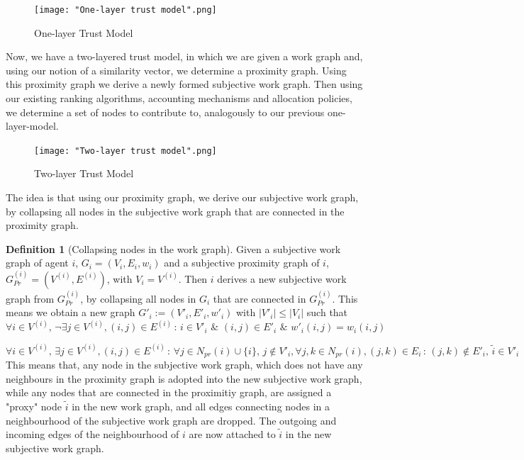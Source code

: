 \documentclass[11pt,a4paper]{article}
\theoremstyle{definition}
\newtheorem{definition}{Definition}[section]
\theoremstyle{theorem}
\theoremstyle{proposition}
\theoremstyle{corollary}
\theoremstyle{lemma}
\theoremstyle{example}
\theoremstyle{remark}
\begin{document}
\begin{figure}[H]
\begin{center}
\texttt{[image: "One-layer trust model".png]}
\caption{One-layer Trust Model}
\label{fig:One-layer trust model}
\end{center}
\end{figure}

\noindent{}Now, we have a two-layered trust model, in which we are given a work graph and, using our notion of a similarity vector, we determine a proximity graph. Using this proximity graph we derive a newly formed subjective work graph. Then using our existing ranking algorithms, accounting mechanisms and allocation policies, we determine a set of nodes to contribute to, analogously to our previous one-layer-model. \vspace{1em}\\

\begin{figure}[H]
\texttt{[image: "Two-layer trust model".png]}
\caption{Two-layer Trust Model}
\label{fig:Two-layer trust model}
\end{figure}
\noindent{}The idea is that using our proximity graph, we derive our subjective work graph, by collapsing all nodes in the subjective work graph that are connected in the proximity graph. \vspace{1em}\\
\newpage
\begin{definition}[Collapsing nodes in the work graph]
Given a subjective work graph of agent $i$, $G_i=(V_i,E_i,w_i)$ and a subjective proximity graph of $i$, $G^{(i)}_{Pr}=(V^{(i)}, E^{(i)})$, with $V_i=V^{(i)}$. Then $i$ derives a new subjective work graph from $G^{(i)}_{Pr}$, by collapsing all nodes in $G_i$ that are connected in $G^{(i)}_{Pr}$. This means we obtain a new graph $G'_i:=(V'_i, E'_i, w'_i)$ with $|V'_i|\leq{}|V_i|$ such that 
\[
\forall{}i\in{}V^{(i)},\,\neg\exists{}j\in{}V^{(i)},(i,j)\in{}E^{(i)}\,:\,i\in{}V'_i\,\,\&\,\,(i,j)\in{}E'_i\,\,\&\,\,w'_i(i,j)=w_i(i,j) 
\]

\[
\forall{}i\in{}V^{(i)},\,\exists{}j\in{}V^{(i)},(i,j)\in{}E^{(i)}\,:\,\forall{}j\in{}N_{pr}(i)\cup{}\lbrace{}i\rbrace,\,j\not\in{}V'_i,\forall{}j,k\in{}N_{pr}(i), (j,k)\in{}E_i\,:\,(j,k)\not\in{}E'_i,\,\tilde{i}\in{}V'_i 
\]
This means that, any node in the subjective work graph, which does not have any neighbours in the proximity graph is adopted into the new subjective work graph, while any nodes that are connected in the proximitiy graph, are assigned a "proxy" node $\tilde{i}$ in the new work graph, and all edges connecting nodes in a neighbourhood of the subjective work graph are dropped. The outgoing and incoming edges of the neighbourhood of $i$ are now attached to $\tilde{i}$ in the new subjective work graph. \vspace{1em}\\
\end{definition}
\end{document}

